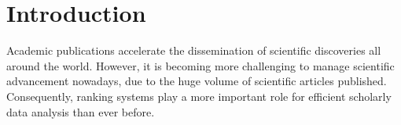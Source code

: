 \section{Introduction}
\label{sec-intro}



Academic publications accelerate the dissemination of scientific discoveries all around the world. However, it is becoming more challenging to manage scientific advancement nowadays, due to the huge volume of scientific articles published. 
Consequently, ranking systems play a more important role for efficient scholarly data analysis than ever before. 






